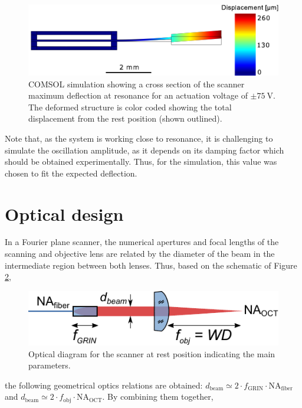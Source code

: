 \documentclass[10pt]{iopart}
\begin{document}
\begin{figure}[h!]\centering
      \includegraphics[width=\columnwidth]{figures/deflection.pdf}
      \caption{COMSOL simulation showing a cross section of the scanner maximum deflection at resonance for an actuation voltage of $\pm \SI{75}{\volt}$. The deformed structure is color coded showing the total displacement from the rest position (shown outlined). }
      \label{fig:defle}
\end{figure}

Note that, as the system is working close to resonance, it is challenging to simulate the oscillation amplitude, as it depends on its damping factor which should be obtained experimentally. Thus, for the simulation, this value was chosen to fit the expected deflection. 



\section{Optical design}
In a Fourier plane scanner, the numerical apertures and focal lengths of the scanning and objective lens are related by the diameter of the beam in the intermediate region between both lenses. Thus, based on the schematic of Figure \ref{fig:opticsParam}, 
\begin{figure}[h!]\centering
      \includegraphics{figures/opticsParam.pdf}
      \caption{Optical diagram for the scanner at rest position indicating the main parameters.}
      \label{fig:opticsParam}
\end{figure}
the following geometrical optics relations are obtained: $d_\mathrm{beam} \simeq 2\cdot f_\mathrm{GRIN}\cdot \mathrm{NA}_\mathrm{fiber}$ and $d_\mathrm{beam} \simeq 2 \cdot f_\mathrm{obj}\cdot \mathrm{NA}_\mathrm{OCT}$. By combining them together,
\end{document}
